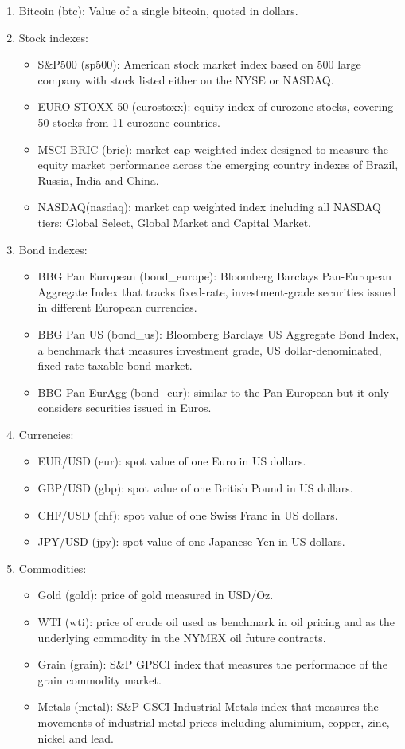 \begin{enumerate}
	\item Bitcoin (btc): Value of a single bitcoin, quoted in dollars.
	\bigskip
	\item Stock indexes:
	\begin{itemize}
		\item S\&P500 (sp500): American stock market index based on 500 large company with stock listed either on the NYSE or NASDAQ.
		\item EURO STOXX 50 (eurostoxx): equity index of eurozone stocks, covering 50 stocks from 11 eurozone countries.
		\item MSCI BRIC (bric): market cap weighted index designed to measure the equity market performance across the emerging country indexes of Brazil, Russia, India and China.
		\item NASDAQ(nasdaq): market cap weighted index including all NASDAQ tiers: Global Select, Global Market and Capital Market.
	\end{itemize}
	\item Bond indexes:
	\begin{itemize}
		\item BBG Pan European (bond\_europe): Bloomberg Barclays Pan-European Aggregate Index that tracks fixed-rate, investment-grade securities issued in different European currencies.
		\item BBG Pan US (bond\_us): Bloomberg Barclays US Aggregate Bond Index, a benchmark that measures investment grade, US dollar-denominated, fixed-rate taxable bond market.
		\item BBG Pan EurAgg (bond\_eur): similar to the Pan European but it only considers securities issued in Euros.
	\end{itemize} 
	\item Currencies:
	\begin{itemize}
		\item EUR/USD (eur): spot value of one Euro in  US dollars. 
		\item GBP/USD (gbp): spot value of one British Pound in US dollars.
		\item CHF/USD (chf): spot value of one Swiss Franc in  US dollars.
		\item JPY/USD (jpy): spot value of one Japanese Yen in  US dollars.
	\end{itemize}
	\item Commodities:
	\begin{itemize}
		\item Gold (gold): price of gold measured in USD/Oz.
		\item WTI (wti): price of crude oil used as benchmark in oil pricing and as the underlying commodity in the NYMEX oil future contracts.
		\item Grain (grain): S\&P GPSCI index that measures the performance of the grain commodity market.
		\item Metals (metal): S\&P GSCI Industrial Metals index that measures the movements of industrial metal prices including aluminium, copper, zinc, nickel and lead.
	\end{itemize}
\end{enumerate}

